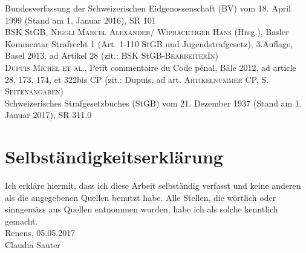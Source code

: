\documentclass[a4paper, 11pt] {article}
\begin{document}
\noindent
Bundesverfassung der Schweizerischen Eidgenossenschaft (BV) vom 18. April 1999 (Stand am 1. Januar 2016), SR 101 \\

\noindent
BSK StGB, \textsc{Niggli Marcel Alexander/ Wiprächtiger Hans} (Hrsg.), Basler Kommentar Strafrecht 1 (Art. 1-110 StGB und Jugendstrafgesetz), 3.Auflage, Basel 2013, ad Artikel 28 (zit.: BSK StGB-\textsc{BearbeiterIn}) \\

\noindent
\textsc{Dupuis Michel et al.}, Petit commentaire du Code pénal, Bâle 2012, ad article 28, 173, 174, et 322bis CP (zit.: Dupuis, ad art. \textsc{Artikelnummer} CP, S. \textsc{Seitenangaben}) \\


\noindent
Schweizerisches Strafgesetzbuches (StGB) vom 21. Dezember 1937 (Stand am 1. Januar 2017), SR 311.0 \\




\newpage
{}
{}
\section*{Selbständigkeitserklärung}

\noindent
Ich erkläre hiermit, dass ich diese Arbeit selbständig verfasst und keine anderen als die angegebenen Quellen benutzt habe. Alle Stellen, die wörtlich oder sinngemäss aus Quellen entnommen wurden, habe ich als solche kenntlich gemacht. \\[1cm]

\noindent
Renens, 05.05.2017 \\[1.5cm]

\noindent
Claudia Sauter
\end{document}
